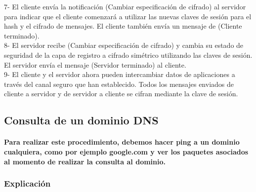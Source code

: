 \documentclass[letterpaper]{article}
\begin{document}
\begin{itemize}
{7- El cliente envía la notificación (Cambiar especificación de cifrado) al servidor para indicar que el cliente comenzará a utilizar las nuevas claves de sesión para el hash y el cifrado de mensajes. El cliente también envía un mensaje de (Cliente terminado).\\
8- El servidor recibe (Cambiar especificación de cifrado) y cambia su estado de seguridad de la capa de registro a cifrado simétrico utilizando las claves de sesión. El servidor envía el mensaje (Servidor terminado) al cliente.\\
9- El cliente y el servidor ahora pueden intercambiar datos de aplicaciones a través del canal seguro que han establecido. Todos los mensajes enviados de cliente a servidor y de servidor a cliente se cifran mediante la clave de sesión.\\ }

\end{itemize}

\subsection{Consulta de un dominio DNS}



\paragraph{Para realizar este procedimiento, debemos hacer ping a un dominio cualquiera, como por ejemplo google.com y ver los paquetes asociados al momento de realizar la consulta al dominio.}

\subsubsection{Explicación}
\end{document}
